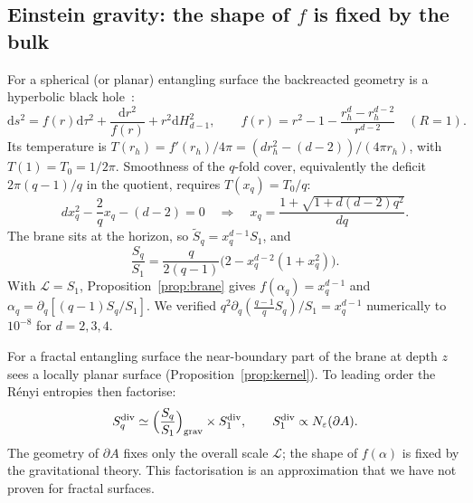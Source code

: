 \documentclass[11pt]{article}
\theoremstyle{definition}\newtheorem{definition}{Definition}[section]
\theoremstyle{remark}\newtheorem*{remark}{Remark}
\newcommand{\dd}{\mathrm{d}}
\begin{document}
\subsection{Einstein gravity: the shape of $f$ is fixed by the bulk}
For a spherical (or planar) entangling surface the backreacted geometry is a hyperbolic black
hole~\cite{HMSY,Dong}:
\begin{equation}
\dd s^2=f(r)\dd\tau^2+\frac{\dd r^2}{f(r)}+r^2\dd H_{d-1}^2,\qquad f(r)=r^2-1-\frac{r_h^{d}-r_h^{d-2}}{r^{d-2}}\quad(R=1).
\end{equation}
Its temperature is $T(r_h)=f'(r_h)/4\pi=(dr_h^2-(d-2))/(4\pi r_h)$, with $T(1)=T_0=1/2\pi$. Smoothness of the
$q$-fold cover, equivalently the deficit $2\pi(q-1)/q$ in the quotient, requires $T(x_q)=T_0/q$:
\begin{equation}
dx_q^2-\frac{2}{q}x_q-(d-2)=0\quad\Longrightarrow\quad x_q=\frac{1+\sqrt{1+d(d-2)q^2}}{dq}.
\end{equation}
The brane sits at the horizon, so $\tilde S_q=x_q^{d-1}S_1$, and~\cite{HMSY}
\begin{equation}
\frac{S_q}{S_1}=\frac{q}{2(q-1)}\Big(2-x_q^{d-2}(1+x_q^2)\Big).
\end{equation}
With $\mathcal L=S_1$, Proposition~\ref{prop:brane} gives $f(\alpha_q)=x_q^{d-1}$ and
$\alpha_q=\partial_q[(q-1)S_q/S_1]$. We verified $q^2\partial_q(\frac{q-1}{q}S_q)/S_1=x_q^{d-1}$ numerically to
$10^{-8}$ for $d=2,3,4$.

For a fractal entangling surface the near-boundary part of the brane at depth $z$ sees a locally planar
surface (Proposition~\ref{prop:kernel}). To leading order the R\'enyi entropies then factorise:
\begin{equation}
S_q^{\rm div}\simeq\Big(\frac{S_q}{S_1}\Big)_{\rm grav}\times S_1^{\rm div},\qquad
S_1^{\rm div}\propto N_\varepsilon(\partial A).
\end{equation}
The geometry of $\partial A$ fixes only the overall scale $\mathcal L$; the shape of $f(\alpha)$ is fixed by the
gravitational theory. This factorisation is an approximation that we have not proven for fractal surfaces.
\end{document}

